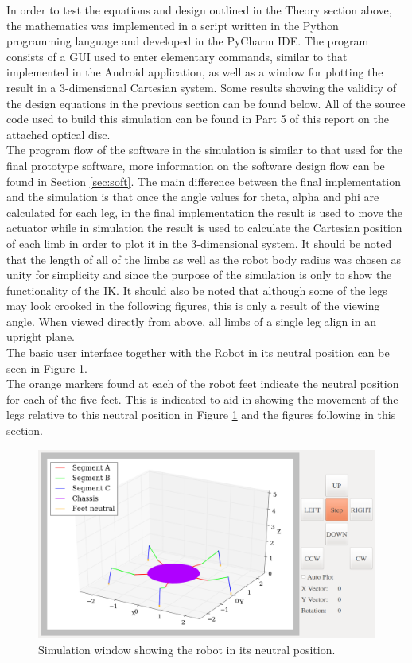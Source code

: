 \label{sec:sim}
In order to test the equations and design outlined in the Theory section above, the mathematics was implemented in a script written in the Python programming language and developed in the PyCharm IDE. The program consists of a GUI  used to enter elementary commands, similar to that implemented in the Android application, as well as a window for plotting the result in a 3-dimensional Cartesian system. Some results showing the validity of the design equations in the previous section can be found below. All of the source code used to build this simulation can be found in Part 5 of this report on the attached optical disc.\\

The program flow of the software in the simulation is similar to that used for the final prototype software, more information on the software design flow can be found in Section \ref{sec:soft}. The main difference between the final implementation and the simulation is that once the angle values for theta, alpha and phi are calculated for each leg, in the final implementation the result is used to move the actuator while in simulation the result is used to calculate the Cartesian position of each limb in order to plot it in the 3-dimensional system. It should be noted that the length of all of the limbs as well as the robot body radius was chosen as unity for simplicity and since the purpose of the simulation is only to show the functionality of the IK. It should also be noted that although some of the legs may look crooked in the following figures, this is only a result of the viewing angle. When viewed directly from above, all limbs of a single leg align in an upright plane.\\

The basic user interface together with the Robot in its neutral position can be seen in Figure \ref{fig:Sim1}.\\

The orange markers found at each of the robot feet indicate the neutral position for each of the five feet. This is indicated to aid in showing the movement of the legs relative to this neutral position in Figure \ref{fig:Sim1} and the figures following in this section.\\

\begin{figure}[H]
\centering
\includegraphics[scale = 0.33]{pics/Sim1.png}
\caption{Simulation window showing the robot in its neutral position.}
\label{fig:Sim1}
\end{figure}

